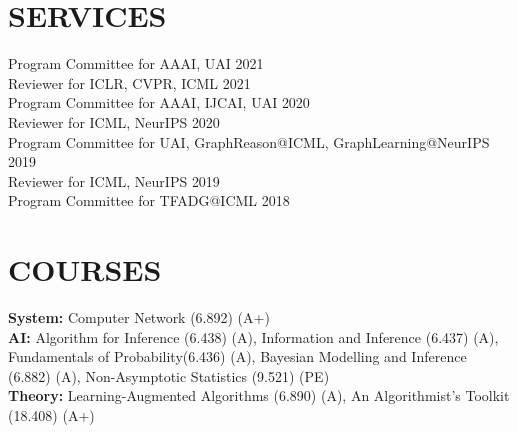 \documentclass[margin]{res}
\begin{document}
\begin{resume}

\section{SERVICES}
Program Committee for AAAI, UAI \hfill{2021}\\
Reviewer for ICLR, CVPR, ICML \hfill{2021}\\
Program Committee for AAAI, IJCAI, UAI \hfill{2020}\\
Reviewer for ICML, NeurIPS \hfill{2020}\\
Program Committee for UAI, GraphReason@ICML, GraphLearning@NeurIPS \hfill{2019}\\
Reviewer for ICML, NeurIPS \hfill{2019}\\
Program Committee for TFADG@ICML \hfill{2018}\\


\section{COURSES}
\textbf{System:} Computer Network (6.892) (A+) \\
\textbf{AI:} Algorithm for Inference (6.438) (A), Information and Inference (6.437) (A), Fundamentals of Probability(6.436) (A), Bayesian Modelling and Inference (6.882) (A), Non-Asymptotic Statistics (9.521) (PE) \\
\textbf{Theory:} Learning-Augmented Algorithms (6.890) (A), An Algorithmist's Toolkit (18.408) (A+)\\


\end{resume}
\end{document}
